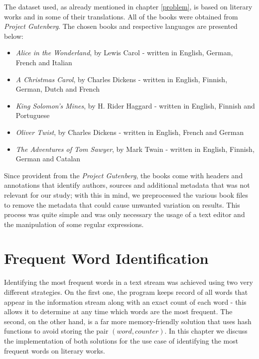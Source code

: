 \documentclass[shortpaper]{revdetua}
\begin{document}
The dataset used, as already mentioned in chapter \ref{problem}, is based on literary works and in some of their translations. 
All of the books were obtained from \textit{Project Gutenberg}\cite{gutenberg}. 
The chosen books and respective languages are presented below:

\begin{itemize}
    \item \textit{Alice in the Wonderland}, by Lewis Carol - written in English, German, French and Italian
    \item \textit{A Christmas Carol}, by Charles Dickens - written in English, Finnish, German, Dutch and French
    \item \textit{King Solomon's Mines}, by H. Rider Haggard - written in English, Finnish and Portuguese
    \item \textit{Oliver Twist}, by Charles Dickens - written in English, French and German
    \item \textit{The Adventures of Tom Sawyer}, by Mark Twain - written in English, Finnish, German and Catalan 
\end{itemize}

Since provident from the \textit{Project Gutenberg}, the books come with headers and annotations that identify authors, sources and additional metadata that 
was not relevant for our study; with this in mind, we preprocessed the various book files to remove the metadata that could cause unwanted variation on results. 
This process was quite simple and was only necessary the usage of a text editor and the manipulation of some regular expressions. 

\section{Frequent Word Identification}\label{algs} %

Identifying the most frequent words in a text stream was achieved using two very different strategies.
On the first one, the program keeps record of all words that appear in the information stream along with an exact count of each word - this allows it to 
determine at any time which words are the most frequent.
The second, on the other hand, is a far more memory-friendly solution that uses hash functions to avoid storing the pair $(word, counter)$.
In this chapter we discuss the implementation of both solutions for the use case of identifying the most frequent words on literary works.
\end{document}
